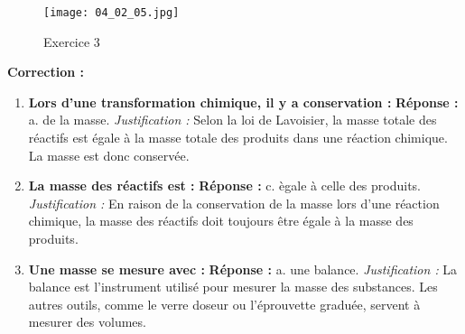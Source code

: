 \documentclass[a4paper,12pt]{article}
\begin{document}
\begin{figure}[H]
  \centering
  \texttt{[image: 04\_02\_05.jpg]}
  \caption{\label{} Exercice 3}
\end{figure}

\textbf{Correction :}

\begin{enumerate}
    \item \textbf{Lors d'une transformation chimique, il y a conservation :} \newline
    \textbf{Réponse :} a. de la masse. \newline
    \textit{Justification :} Selon la loi de Lavoisier, la masse totale des réactifs est égale à la masse totale des produits dans une réaction chimique. La masse est donc conservée.

    \item \textbf{La masse des r\'eactifs est :} \newline
    \textbf{Réponse :} c. \`egale \`a celle des produits. \newline
    \textit{Justification :} En raison de la conservation de la masse lors d'une réaction chimique, la masse des réactifs doit toujours être égale à la masse des produits.

    \item \textbf{Une masse se mesure avec :} \newline
    \textbf{Réponse :} a. une balance. \newline
    \textit{Justification :} La balance est l'instrument utilisé pour mesurer la masse des substances. Les autres outils, comme le verre doseur ou l'éprouvette graduée, servent à mesurer des volumes.
\end{enumerate}
\end{document}
